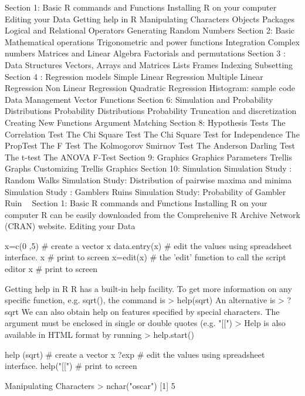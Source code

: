 Section 1: Basic R commands and Functions
Installing R on your computer
Editing your Data
Getting help in R
Manipulating Characters
Objects
Packages
Logical and Relational Operators
Generating Random Numbers
Section 2: Basic Mathematical operations
Trigonometric and power functions
Integration
Complex numbers
Matrices and Linear Algebra
Factorials and permutations
Section 3 : Data Structures
Vectors, Arrays and Matrices
Lists
Frames
Indexing
Subsetting
Section 4 : Regression models
Simple Linear Regression
Multiple Linear Regression
Non Linear Regression
Quadratic Regression
Histogram: sample code
Data Management
Vector Functions
Section 6: Simulation and Probability Distributions
Probability Distributions
Probability
Truncation and discretization
Creating New Functions
Argument Matching
Section 8: Hypothesis Tests
The Correlation Test
The Chi Square Test
The Chi Square Test for Independence
The PropTest
The F Test
The Kolmogorov Smirnov Test
The Anderson Darling Test
The t-test
The ANOVA F-Test
Section 9: Graphics
Graphics Parameters
Trellis Graphs
Customizing Trellis Graphics
Section 10: Simulation
Simulation Study : Random Walks
Simulation Study: Distribution of pairwise maxima and minima
Simulation Study : Gamblers Ruins
Simulation Study: Probability of Gambler Ruin

Section 1: Basic R commands and Functions
Installing R on your computer
R can be easily downloaded from the Comprehenive R Archive Network (CRAN) website.
Editing your Data

x=c(0 ,5)     	      # create a vector x
data.entry(x)  	   # edit the values using spreadsheet interface.
x  	                     # print to screen
x=edit(x)	          # the 'edit' function to call the script editor
x  	                     # print to screen

Getting help in R
R has a built-in help facility. To get more information on any specific function, e.g. sqrt(), the command is
> help(sqrt)
An alternative is
> ? sqrt
We can also obtain help on features specified by special characters.
The argument must be enclosed in single or double quotes (e.g. "[[")
> 
Help is also available in HTML format by running
> help.start()



help (sqrt)   	      # create a vector x
?exp  	   		  # edit the values using spreadsheet interface.
help("[[")	         # print to screen

Manipulating Characters
> nchar("oscar")
[1] 5

